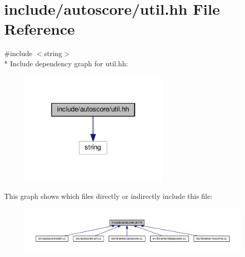 \hypertarget{util_8hh}{}\section{include/autoscore/util.hh File Reference}
\label{util_8hh}
{\ttfamily \#include $<$string$>$}\\*
Include dependency graph for util.\+hh\+:
\nopagebreak
\begin{figure}[H]
\begin{center}
\leavevmode
\includegraphics[width=202pt]{util_8hh__incl}
\end{center}
\end{figure}
This graph shows which files directly or indirectly include this file\+:
\nopagebreak
\begin{figure}[H]
\begin{center}
\leavevmode
\includegraphics[width=350pt]{util_8hh__dep__incl}
\end{center}
\end{figure}
